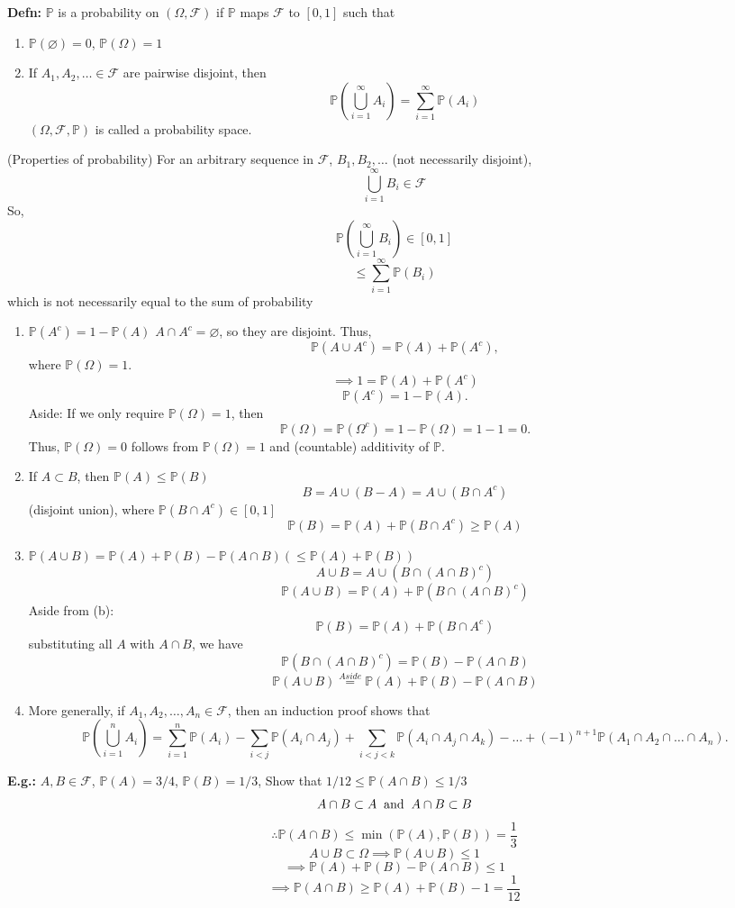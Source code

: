 \documentclass[a4paper]{article}
\newcommand{\n}{\hfill\break}
\newcommand{\defn}[1]{\par\noindent\settowidth{\hangindent}{\textbf{Defn: }}\textbf{Defn: }#1\n}
\newcommand{\eg}[1]{\par\noindent\settowidth{\hangindent}{\textbf{E.g.: }}\textbf{E.g.: }#1\n}
\newcommand{\F}{\mathcal F}
\newcommand{\Prob}{\mathbb{P}}
\renewcommand{\P}{\Prob}
\begin{document}
\defn{$\P$ is a probability on $(\Omega, \F)$ if $\P$ maps $\F$ to $[0, 1]$ such that
\begin{enumerate}
    \item $\P(\varnothing)=0$, $\P(\Omega)=1$
    \item If $A_1, A_2, \dots\in\F$ are pairwise disjoint, then\[\P\left(\bigcup^\infty_{i=1}A_i\right)=\sum^\infty_{i=1}\P(A_i)\] $(\Omega, \F, \P)$ is called a probability space.
\end{enumerate}
(Properties of probability) For an arbitrary sequence in $\F$, $B_1, B_2, \dots$ (not necessarily disjoint),\[\bigcup^\infty_{i=1}B_i\in\F\]
So, \[\P\left(\bigcup^\infty_{i=1}B_i\right)\in[0,1]\]
\[\leq\sum^\infty_{i=1}\P(B_i)\]
which is not necessarily equal to the sum of probability

\begin{enumerate}
    \item  $\P(A^c)=1-\P(A)$
$A\cap A^c=\varnothing$, so they are disjoint. Thus, 
\[\P(A\cup A^c)=\P(A)+\P(A^c),\]where $\P(\Omega)=1$. 
\[\implies 1=\P(A)+\P(A^c)\]
\[\P(A^c)=1-\P(A).\]
Aside: If we only require $\P(\Omega)=1$, then
\[\P(\Omega)=\P(\Omega^c)=1-\P(\Omega)=1-1=0.\]
Thus, $\P(\Omega)=0$ follows from $\P(\Omega)=1$ and (countable) additivity of $\P$.

    \item If $A\subset B$, then $\P(A)\leq\P(B)$
\[B=A\cup(B-A)=A\cup(B\cap A^c)\] (disjoint union), where $\P(B\cap A^c)\in[0, 1]$
\[\P(B)=\P(A)+\P(B\cap A^c)\geq\P(A)\]

    \item $\P(A\cup B)=\P(A)+\P(B)-\P(A\cap B)(\leq\P(A)+\P(B))$
\[A\cup B=A\cup(B\cap(A\cap B)^c)\]
\[\P(A\cup B)=\P(A)+\P(B\cap(A\cap B)^c)\]
Aside from (b):
\[\P(B)=\P(A)+\P(B\cap A^c)\]
substituting all $A$ with $A\cap B$, we have 
\[\P(B\cap(A\cap B)^c)=\P(B)-\P(A\cap B)\]
\[\P(A\cup B)\overset{Aside}=\P(A)+\P(B)-\P(A\cap B)\]

    \item More generally, if $A_1, A_2, \dots, A_n\in\F$, then an induction proof shows that
\[\P\left(\bigcup^n_{i=1}A_i\right)=\sum^n_{i=1}\P(A_i)-\sum_{i<j}\P(A_i\cap A_j)+\sum_{i<j<k}\P(A_i\cap A_j\cap A_k)-\dots+(-1)^{n+1}\P(A_1\cap A_2\cap\dots\cap A_n).\]
\end{enumerate}
}

\eg{ $A, B\in\F$, $\P(A)=3/4$, $\P(B)=1/3$, Show that $1/12\leq\P(A\cap B)\leq1/3$
\[A\cap B\subset A\text{\;\;and\;\;}A\cap B\subset B\]
\[\therefore \P(A\cap B)\leq\min(\P(A), \P(B))=\frac{1}{3}\]
\[A\cup B\subset\Omega\implies\P(A\cup B)\leq 1\]
\[\implies\P(A)+\P(B)-\P(A\cap B)\leq 1\]
\[\implies\P(A\cap B)\geq\P(A)+\P(B)-1=\frac{1}{12}\]
}
\end{document}
